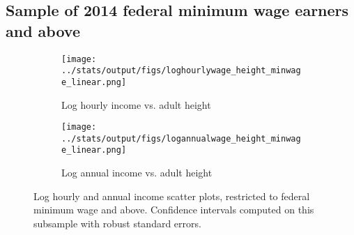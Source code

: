 \subsection{Sample of 2014 federal minimum wage earners and above}
\begin{figure}[htbp]
	\begin{subfigure}[b]{0.9\textwidth}
		\centering
		\texttt{[image: ../stats/output/figs/loghourlywage\_height\_minwage\_linear.png]}	
		\label{fig:loghourlywageheight_minwage}
		\caption{Log hourly income vs. adult height}
	\end{subfigure}
	
	\begin{subfigure}[b]{0.9\textwidth}
		\centering
		\texttt{[image: ../stats/output/figs/logannualwage\_height\_minwage\_linear.png]}	
		\label{fig:logannualwageheight_minwage}
		\caption{Log annual income vs. adult height}
	\end{subfigure}
	\caption{Log hourly and annual income scatter plots, restricted to federal minimum wage and above. Confidence intervals computed on this subsample with robust standard errors.}
\end{figure}

